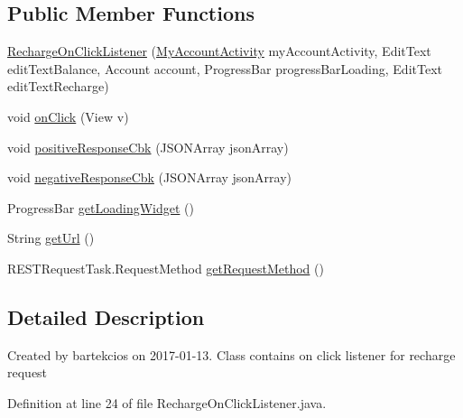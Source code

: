 \subsection*{Public Member Functions}
\begin{DoxyCompactItemize}
\item 
\hyperlink{classcom_1_1bartekcios_1_1ticketsclient_1_1_recharge_on_click_listener_ae2fa3c418eb0a4ed7c453f51c52d2bc4}{Recharge\+On\+Click\+Listener} (\hyperlink{classcom_1_1bartekcios_1_1ticketsclient_1_1_my_account_activity}{My\+Account\+Activity} my\+Account\+Activity, Edit\+Text edit\+Text\+Balance, Account account, Progress\+Bar progress\+Bar\+Loading, Edit\+Text edit\+Text\+Recharge)
\item 
void \hyperlink{classcom_1_1bartekcios_1_1ticketsclient_1_1_recharge_on_click_listener_a90b8b4259ffb2f68fe2f2699b9a07aa1}{on\+Click} (View v)
\item 
void \hyperlink{classcom_1_1bartekcios_1_1ticketsclient_1_1_recharge_on_click_listener_a23daefa79eaa242798ab94f1fee5dd16}{positive\+Response\+Cbk} (J\+S\+O\+N\+Array json\+Array)
\item 
void \hyperlink{classcom_1_1bartekcios_1_1ticketsclient_1_1_recharge_on_click_listener_acc89f5bc094cd48c3c2bf60b78adf0e8}{negative\+Response\+Cbk} (J\+S\+O\+N\+Array json\+Array)
\item 
Progress\+Bar \hyperlink{classcom_1_1bartekcios_1_1ticketsclient_1_1_recharge_on_click_listener_aec7599a1a9419e463f06d8d523642ffe}{get\+Loading\+Widget} ()
\item 
String \hyperlink{classcom_1_1bartekcios_1_1ticketsclient_1_1_recharge_on_click_listener_ae0509f212c88b2b143c0285970c9674d}{get\+Url} ()
\item 
R\+E\+S\+T\+Request\+Task.\+Request\+Method \hyperlink{classcom_1_1bartekcios_1_1ticketsclient_1_1_recharge_on_click_listener_ab1f9eaac36fb11b24dbe126b5d3b4606}{get\+Request\+Method} ()
\end{DoxyCompactItemize}


\subsection{Detailed Description}
Created by bartekcios on 2017-\/01-\/13. Class contains on click listener for recharge request 

Definition at line 24 of file Recharge\+On\+Click\+Listener.\+java.



